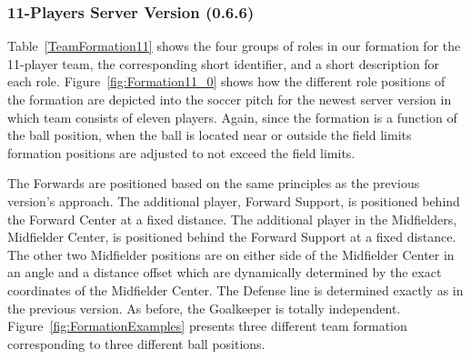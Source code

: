 \subsubsection*{11-Players Server Version (0.6.6)} 

Table~\ref{TeamFormation11} shows the four groups of roles in our formation for the 11-player team, the corresponding short identifier, and a short description for each role.
Figure~\ref{fig:Formation11_0} shows how the different role positions of the formation are depicted into the soccer pitch for the newest server version in which team consists of eleven players. Again, since the formation is a function of the ball position, when the ball is located near or outside the field limits formation positions are adjusted to not exceed the field limits.


The Forwards are positioned based on the same principles as the previous version's approach. The additional player, Forward Support, is positioned behind the Forward Center at a fixed distance. The additional player in the Midfielders, Midfielder Center, is positioned behind  the Forward Support at a fixed distance. The other two Midfielder positions are on either side of the Midfielder Center in an angle and a distance offset which are dynamically determined by the exact coordinates of the Midfielder Center. The Defense line is determined exactly as in the previous version. As before, the Goalkeeper is totally independent. Figure~\ref{fig:FormationExamples} presents three different team formation corresponding to three different ball positions. 




